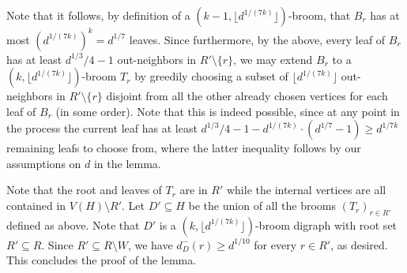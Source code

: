 \documentclass[10pt,a4paper]{amsart}
\makeatletter
\renewenvironment{proof}[1][\proofname] {\par\pushQED{\qed}\normalfont\topsep6\p@\@plus6\p@\relax\trivlist\item[\hskip\labelsep\bfseries#1\@addpunct{.}]\ignorespaces}{\popQED\endtrivlist\@endpefalse}
\makeatother
\begin{document}
\begin{proof}
    Note that it follows, by definition of a $(k-1,\lfloor d^{1/(7k)}\rfloor)$-broom, that $B_r$ has at most $(d^{1/(7k)})^k=d^{1/7}$ leaves. Since furthermore, by the above, every leaf of $B_r$ has at least $d^{1/3}/4-1$ out-neighbors in $R'\setminus \{r\}$, we may extend $B_r$ to a $(k,\lfloor d^{1/(7k)}\rfloor)$-broom $T_r$ by greedily choosing a subset of $\lfloor d^{1/(7k)}\rfloor$ out-neighbors in $R'\setminus \{r\}$ disjoint from all the other already chosen vertices for each leaf of $B_r$ (in some order). Note that this is indeed possible, since at any point in the process the current leaf has at least $d^{1/3}/4-1-d^{1/(7k)}\cdot (d^{1/7}-1)\ge d^{1/7k}$ remaining leafs to choose from, where the latter inequality follows by our assumptions on $d$ in the lemma.
    
    Note that the root and leaves of $T_r$ are in $R'$ while the internal vertices are all contained in $V(H)\setminus R'$. Let $D'\subseteq H$ be the union of all the brooms $(T_r)_{r\in R'}$ defined as above. Note that $D'$ is a $(k,\lfloor d^{1/(7k)}\rfloor)$-broom digraph with root set $R'\subseteq R$. Since $R'\subseteq R\setminus W$, we have $d_D^-(r)\ge d^{1/10}$ for every $r\in R'$, as desired. This concludes the proof of the lemma.
\end{proof}
\end{document}

